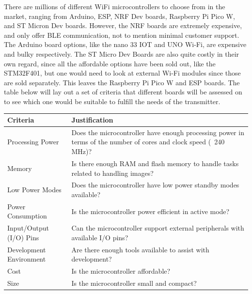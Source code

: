 \documentclass[class=report,11pt,crop=false]{standalone}
\begin{document}
There are millions of different WiFi microcontrollers to choose from in the market, ranging from Arduino, ESP, NRF Dev boards, Raspberry Pi Pico W, and ST Micron Dev boards. However, the NRF boards are extremely expensive, and only offer BLE communication, not to mention minimal customer support. The Arduino board options, like the nano 33 IOT and UNO Wi-Fi, are expensive and bulky respectively. The ST Micro Dev Boards are also quite costly in their own regard, since all the affordable options have been sold out, like the STM32F401, but one would need to look at external Wi-Fi modules since those are sold separately. This leaves the Raspberry Pi Pico W and ESP boards. The table below will lay out a set of criteria that different boards will be assessed on to see which one would be suitable to fulfill the needs of the transmitter.

\begin{table}[h]
\centering
\begin{tabular}{|l|p{10cm}|}
\hline
\textbf{Criteria} & \textbf{Justification} \\
\hline
Processing Power & Does the microcontroller have enough processing power in terms of the number of cores and clock speed (~240 MHz)? \\
\hline
Memory & Is there enough RAM and flash memory to handle tasks related to handling images? \\
\hline
Low Power Modes & Does the microcontroller have low power standby modes available? \\
\hline
Power Consumption & Is the microcontroller power efficient in active mode? \\
\hline
Input/Output (I/O) Pins & Can the microcontroller support external peripherals with available I/O pins? \\
\hline
Development Environment & Are there enough tools available to assist with development? \\
\hline
Cost & Is the microcontroller affordable? \\
\hline
Size & Is the microcontroller small and compact? \\
\hline
\end{tabular}
\label{tab:microcontroller_criteria1}
\end{table}
\end{document}
